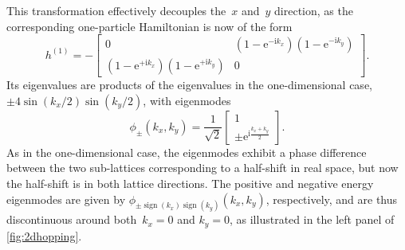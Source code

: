 \documentclass[aps,pra,reprint,superscriptaddress,floatfix,amsmath,amssymb,amsfonts]{revtex4-1}
\DeclareMathOperator{\sign}{sign}
\newcommand*{\rmi}{\mathrm{i}}
\newcommand*{\rme}{\mathrm{e}}
\begin{document}
This transformation effectively decouples the~$x$ and~$y$ direction, as the corresponding one-particle Hamiltonian is now of the form
\begin{equation*}
  h^{(1)} = -\begin{bmatrix} 0 & (1 - \rme^{-\rmi k_x})(1-\rme^{-\rmi k_y})\\ (1 - \rme^{+\rmi k_x})(1-\rme^{+\rmi k_y})&0\end{bmatrix}.
\end{equation*}
Its eigenvalues are products of the eigenvalues in the one-dimensional case, $\pm 4 \sin(k_x/2) \sin(k_y/2)$, with eigenmodes
\[ \phi_\pm(k_x,k_y)=\frac1{\sqrt2}\begin{bmatrix}1\\\pm\rme^{\rmi\frac{k_x+k_y}2}\end{bmatrix}. \]
As in the one-dimensional case, the eigenmodes exhibit a phase difference between the two sub-lattices corresponding to a half-shift in real space, but now the half-shift is in both lattice directions.
The positive and negative energy eigenmodes are given by $\phi_{\pm\sign(k_x)\sign(k_y)}(k_x,k_y)$, respectively, and are thus discontinuous around both~$k_x=0$ and $k_y=0$, as illustrated in the left panel of \cref{fig:2dhopping}.
\end{document}
